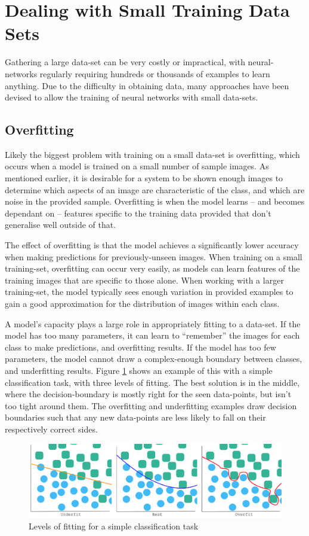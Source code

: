 \documentclass{report}
\begin{document}
\section{Dealing with Small Training Data Sets}
Gathering a large data-set can be very costly or impractical, with neural-networks regularly requiring hundreds or thousands of examples to learn anything. Due to the difficulty in obtaining data, many approaches have been devised to allow the training of neural networks with small data-sets. \par

\subsection{Overfitting}
Likely the biggest problem with training on a small data-set is overfitting, which occurs when a model is trained on a small number of sample images. As mentioned earlier, it is desirable for a system to be shown enough images to determine which aspects of an image are characteristic of the class, and which are noise in the provided sample. Overfitting is when the model learns -- and becomes dependant on -- features specific to the training data provided that don't generalise well outside of that. \par
The effect of overfitting is that the model achieves a significantly lower accuracy when making predictions for previously-unseen images. When training on  a small training-set, overfitting can occur very easily, as models can learn features of the training images that are specific to those alone. When working with a larger training-set, the model typically sees enough variation in provided examples to gain a good approximation for the distribution of images within each class. \par
A model's capacity plays a large role in appropriately fitting to a data-set. If the model has too many parameters, it can learn to ``remember'' the images for each class to make predictions, and overfitting results. If the model has too few parameters, the model cannot draw a complex-enough boundary between classes, and underfitting results. Figure \ref{fig:fitting:1} shows an example of this with a simple classification task, with three levels of fitting. The best solution is in the middle, where the decision-boundary is mostly right for the seen data-points, but isn't too tight around them. The overfitting and underfitting examples draw decision boundaries such that any new data-points are less likely to fall on their respectively correct sides. \par
\begin{figure}[!h]
 \centering
 \includegraphics[width=14cm]{fitting}
 \caption{Levels of fitting for a simple classification task}
 \label{fig:fitting:1}
\end{figure}
\end{document}
